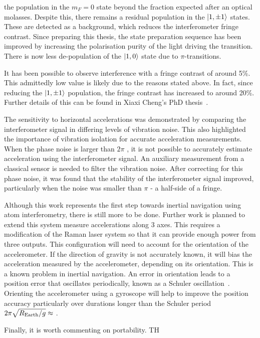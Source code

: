 the population in the $m_F = 0$ state beyond the fraction expected
after an optical molasses. Despite this, there remains a residual
population in the $\ket{1,\pm 1}$ states. These are detected as a
background, which reduces the interferometer fringe contrast. Since
preparing this thesis, the state preparation sequence has been
improved by increasing the polarisation purity of the light driving
the  transition. There is now less de-population of the
$\ket{1,0}$ state due to $\pi$-transitions. 
\par\noindent
It has been possible to observe interference with a fringe contrast of
around 5\%. This admittedly low value is likely due to the reasons
stated above. In fact, since reducing the $\ket{1,\pm 1}$ population,
the fringe contrast has increased to around 20\%. Further details of
this can be found in Xiaxi Cheng's PhD thesis~\cite{Cheng2018}.
\par\noindent
The sensitivity to horizontal accelerations was demonstrated by
comparing the interferometer signal in differing levels of vibration
noise. This also highlighted the importance of vibration isolation for
accurate acceleration measurements. When the phase noise is larger
than $2\pi$ \sivalue{}{\radian}, it
is not possible to accurately estimate acceleration using the
interferometer signal. An auxiliary measurement from a classical
sensor is needed to filter the vibration noise. After correcting for
this phase noise, it was found that the stability of the
interferometer signal improved, particularly when the noise was
smaller than $\pi$ \sivalue{}{\radian} - a half-side of a fringe. 
\par\noindent
Although this work represents the first step towards inertial
navigation using atom interferometry, there is still more to be done.
Further work is planned to extend this system measure accelerations
along 3 axes. This requires a modification of the Raman laser system so
that it can provide enough power from three outputs. This
configuration will need to account for the orientation of the
accelerometer. If the
direction of gravity is not accurately known, it will bias the
acceleration measured by the accelerometer, depending on its
orientation. This is a known problem in inertial navigation. An error
in orientation leads to a
position error that oscillates periodically, known as a Schuler
oscillation~\cite{Schuler1923}. Orienting the accelerometer using a
gyroscope will help to improve the position accuracy particularly over
durations longer than the Schuler period $2\pi
\sqrt{R_\textnormal{Earth}/g} \approx$
.
\par\noindent
Finally, it is worth commenting on portability. TH
